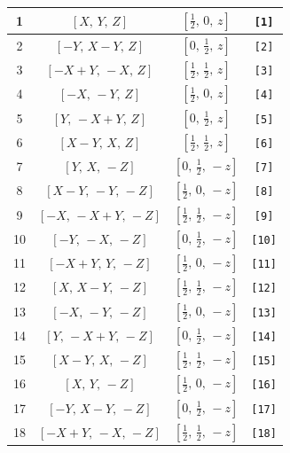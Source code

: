 \documentclass[fleqn,8pt]{jsarticle}
\begin{document}
\begin{longtable}{cccc}
1 & $\left[ X,\, Y,\, Z \right]$ & $\left[ \frac{1}{2},\, 0,\, z \right]$ & {\tt [1]} \\ \hline
2 & $\left[ - Y,\, X - Y,\, Z \right]$ & $\left[ 0,\, \frac{1}{2},\, z \right]$ & {\tt [2]} \\ \hline
3 & $\left[ - X + Y,\, - X,\, Z \right]$ & $\left[ \frac{1}{2},\, \frac{1}{2},\, z \right]$ & {\tt [3]} \\ \hline
4 & $\left[ - X,\, - Y,\, Z \right]$ & $\left[ \frac{1}{2},\, 0,\, z \right]$ & {\tt [4]} \\ \hline
5 & $\left[ Y,\, - X + Y,\, Z \right]$ & $\left[ 0,\, \frac{1}{2},\, z \right]$ & {\tt [5]} \\ \hline
6 & $\left[ X - Y,\, X,\, Z \right]$ & $\left[ \frac{1}{2},\, \frac{1}{2},\, z \right]$ & {\tt [6]} \\ \hline
7 & $\left[ Y,\, X,\, - Z \right]$ & $\left[ 0,\, \frac{1}{2},\, - z \right]$ & {\tt [7]} \\ \hline
8 & $\left[ X - Y,\, - Y,\, - Z \right]$ & $\left[ \frac{1}{2},\, 0,\, - z \right]$ & {\tt [8]} \\ \hline
9 & $\left[ - X,\, - X + Y,\, - Z \right]$ & $\left[ \frac{1}{2},\, \frac{1}{2},\, - z \right]$ & {\tt [9]} \\ \hline
10 & $\left[ - Y,\, - X,\, - Z \right]$ & $\left[ 0,\, \frac{1}{2},\, - z \right]$ & {\tt [10]} \\ \hline
11 & $\left[ - X + Y,\, Y,\, - Z \right]$ & $\left[ \frac{1}{2},\, 0,\, - z \right]$ & {\tt [11]} \\ \hline
12 & $\left[ X,\, X - Y,\, - Z \right]$ & $\left[ \frac{1}{2},\, \frac{1}{2},\, - z \right]$ & {\tt [12]} \\ \hline
13 & $\left[ - X,\, - Y,\, - Z \right]$ & $\left[ \frac{1}{2},\, 0,\, - z \right]$ & {\tt [13]} \\ \hline
14 & $\left[ Y,\, - X + Y,\, - Z \right]$ & $\left[ 0,\, \frac{1}{2},\, - z \right]$ & {\tt [14]} \\ \hline
15 & $\left[ X - Y,\, X,\, - Z \right]$ & $\left[ \frac{1}{2},\, \frac{1}{2},\, - z \right]$ & {\tt [15]} \\ \hline
16 & $\left[ X,\, Y,\, - Z \right]$ & $\left[ \frac{1}{2},\, 0,\, - z \right]$ & {\tt [16]} \\ \hline
17 & $\left[ - Y,\, X - Y,\, - Z \right]$ & $\left[ 0,\, \frac{1}{2},\, - z \right]$ & {\tt [17]} \\ \hline
18 & $\left[ - X + Y,\, - X,\, - Z \right]$ & $\left[ \frac{1}{2},\, \frac{1}{2},\, - z \right]$ & {\tt [18]} \\ \hline

\end{longtable}
\end{document}
